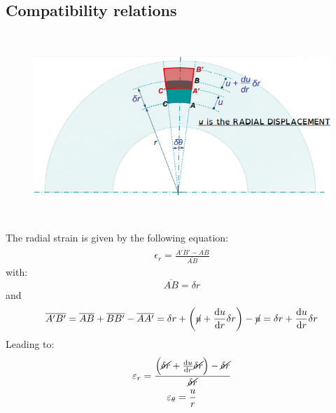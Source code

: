 \documentclass[class=report, crop=false, 12pt,a4paper]{standalone}
\begin{document}
\subsection{Compatibility relations}
\begin{figure}[H]
    \centering
    \includegraphics[height = 7cm]{../img/diagram110.png}
    \caption{}
\end{figure}
The radial strain is given by the following equation:
\begin{gather}
    \epsilon_r = \frac{\overline{A'B'} - \overline{AB}}{\overline{AB}}
\end{gather}
with: 
\begin{equation}
    \overline{AB} = \delta r
\end{equation}
and 
\begin{equation}
    \overline{A'B'} = \overline{AB} + \overline{BB'} - \overline{AA'} = \delta r + \left(\cancel{u} + \frac{\dif u}{\dif r} \delta r \right) - \cancel{u} = \delta r + \frac{\dif u}{\dif r} \delta r
\end{equation}
Leading to:
\begin{gather}
    \varepsilon_r = \frac{\left(\cancel{\delta r}+ \frac{\dif u }{\dif r} \cancel{\delta r}\right) - \cancel{\delta r}}{\cancel{\delta r}}\\
    \varepsilon_{\theta} = \frac{u}{r}
\end{gather}
\end{document}

